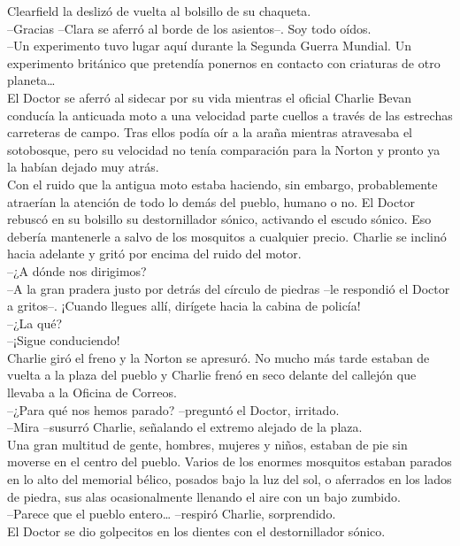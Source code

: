 Clearfield la deslizó de vuelta al bolsillo de su chaqueta.\\
--Gracias --Clara se aferró al borde de los asientos--. Soy todo
oídos.\\
--Un experimento tuvo lugar aquí durante la Segunda Guerra Mundial. Un
experimento británico que pretendía ponernos en contacto con criaturas
de otro planeta\ldots{}\\[2\baselineskip]El Doctor se aferró al sidecar
por su vida mientras el oficial Charlie Bevan conducía la anticuada moto
a una velocidad parte cuellos a través de las estrechas carreteras de
campo. Tras ellos podía oír a la araña mientras atravesaba el
sotobosque, pero su velocidad no tenía comparación para la Norton y
pronto ya la habían dejado muy atrás.\\
Con el ruido que la antigua moto estaba haciendo, sin embargo,
probablemente atraerían la atención de todo lo demás del pueblo, humano
o no. El Doctor rebuscó en su bolsillo su destornillador sónico,
activando el escudo sónico. Eso debería mantenerle a salvo de los
mosquitos a cualquier precio. Charlie se inclinó hacia adelante y gritó
por encima del ruido del motor.\\
--¿A dónde nos dirigimos?\\
--A la gran pradera justo por detrás del círculo de piedras --le
respondió el Doctor a gritos--. ¡Cuando llegues allí, dirígete hacia la
cabina de policía!\\
--¿La qué?\\
--¡Sigue conduciendo!\\
Charlie giró el freno y la Norton se apresuró. No mucho más tarde
estaban de vuelta a la plaza del pueblo y Charlie frenó en seco delante
del callejón que llevaba a la Oficina de Correos.\\
--¿Para qué nos hemos parado? --preguntó el Doctor, irritado.\\
--Mira --susurró Charlie, señalando el extremo alejado de la plaza.\\
Una gran multitud de gente, hombres, mujeres y niños, estaban de pie sin
moverse en el centro del pueblo. Varios de los enormes mosquitos estaban
parados en lo alto del memorial bélico, posados bajo la luz del sol, o
aferrados en los lados de piedra, sus alas ocasionalmente llenando el
aire con un bajo zumbido.\\
--Parece que el pueblo entero\ldots{} --respiró Charlie, sorprendido.\\
El Doctor se dio golpecitos en los dientes con el destornillador
sónico.\\
